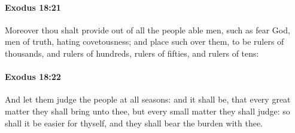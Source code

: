 		\paragraph{Exodus 18:21} %
			\label{EXODUS-18-21}

			Moreover thou shalt provide out of all the people able men, such as fear God, men of truth, hating covetousness; and place such over them, to be rulers of thousands, and rulers of hundreds, rulers of fifties, and rulers of tens:


		\paragraph{Exodus 18:22} %
			\label{EXODUS-18-22}

			And let them judge the people at all seasons: and it shall be, that every great matter they shall bring unto thee, but every small matter they shall judge: so shall it be easier for thyself, and they shall bear the burden with thee.

